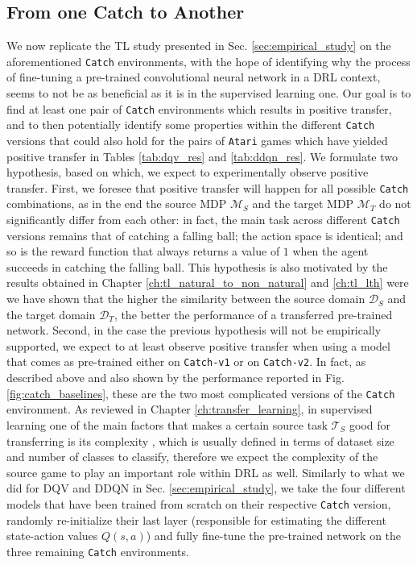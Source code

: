 \subsection{From one Catch to Another}
\label{sec:from_one_catch_to_another}
We now replicate the TL study presented in Sec. \ref{sec:empirical_study} on the aforementioned \texttt{Catch} environments, with the hope of identifying why the process of fine-tuning a pre-trained convolutional neural network in a DRL context, seems to not be as beneficial as it is in the supervised learning one. Our goal is to find at least one pair of \texttt{Catch} environments which results in positive transfer, and to then potentially identify some properties within the different \texttt{Catch} versions that could also hold for the pairs of \texttt{Atari} games which have yielded positive transfer in Tables \ref{tab:dqv_res} and \ref{tab:ddqn_res}. We formulate two hypothesis, based on which, we expect to experimentally observe positive transfer. First, we foresee that positive transfer will happen for all possible \texttt{Catch} combinations, as in the end the source MDP $\mathcal{M}_S$ and the target MDP $\mathcal{M}_T$ do not significantly differ from each other: in fact, the main task across different \texttt{Catch} versions remains that of catching a falling ball; the action space is identical; and so is the reward function that always returns a value of $1$ when the agent succeeds in catching the falling ball. This hypothesis is also motivated by the results obtained in Chapter \ref{ch:tl_natural_to_non_natural} and \ref{ch:tl_lth} were we have shown that the higher the similarity between the source domain $\mathcal{D}_S$ and the target domain $\mathcal{D}_T$, the better the performance of a transferred pre-trained network.
Second, in the case the previous hypothesis will not be empirically supported, we expect to at least observe positive transfer when using a model that comes as pre-trained either on \texttt{Catch-v1} or on \texttt{Catch-v2}. In fact, as described above and also shown by the performance reported in Fig. \ref{fig:catch_baselines}, these are the two most complicated versions of the \texttt{Catch} environment. As reviewed in Chapter \ref{ch:transfer_learning}, in supervised learning one of the main factors that makes a certain source task $\mathcal{T}_S$ good for transferring is its complexity \cite{mensink2021factors}, which is usually defined in terms of dataset size and number of classes to classify, therefore we expect the complexity of the source game to play an important role within DRL as well. Similarly to what we did for DQV and DDQN in Sec. \ref{sec:empirical_study}, we take the four different models that have been trained from scratch on their respective \texttt{Catch} version, randomly re-initialize their last layer (responsible for estimating the different state-action values $Q(s,a)$) and fully fine-tune the pre-trained network on the three remaining \texttt{Catch} environments.
